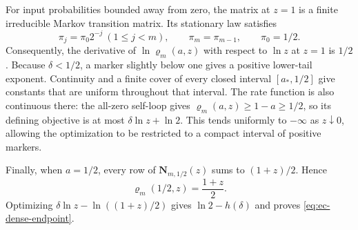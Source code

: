 For input probabilities bounded away from zero, the matrix at $z=1$ is a
finite irreducible Markov transition matrix.  Its stationary law satisfies
\begin{equation}
 \pi_j=\pi_0 2^{-j}\ (1\leq j<m),\qquad
 \pi_m=\pi_{m-1},\qquad \pi_0=1/2.
 \label{eq:ec-stationary-law}
\end{equation}
Consequently, the derivative of $\ln\varrho_m(a,z)$ with respect to $\ln z$
at $z=1$ is $1/2$.  Because $\delta<1/2$, a marker slightly below one gives
a positive lower-tail exponent.  Continuity and a finite cover of every
closed interval $[a_*,1/2]$ give constants that are uniform throughout that
interval.  The rate function is also continuous there: the all-zero
self-loop gives $\varrho_m(a,z)\geq1-a\geq1/2$, so its defining objective
is at most $\delta\ln z+\ln2$.  This tends uniformly to $-\infty$ as
$z\downarrow0$, allowing the optimization to be restricted to a compact
interval of positive markers.

Finally, when $a=1/2$, every row of $\mathbf N_{m,1/2}(z)$ sums to
$(1+z)/2$.  Hence
\begin{equation}
 \varrho_m(1/2,z)=\frac{1+z}{2}.
\end{equation}
Optimizing $\delta\ln z-\ln((1+z)/2)$ gives
$\ln2-h(\delta)$ and proves \eqref{eq:ec-dense-endpoint}.

